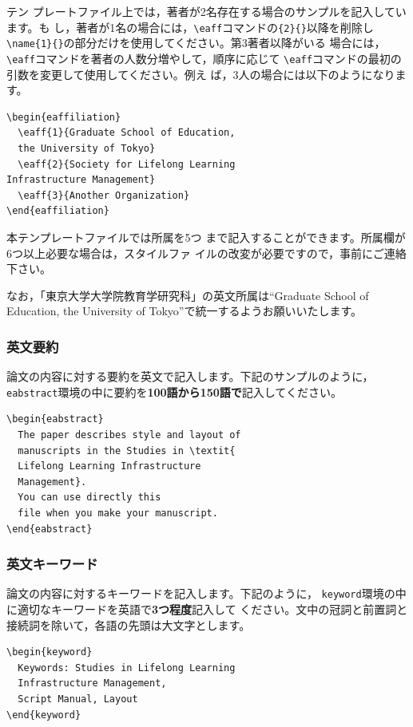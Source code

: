 \documentclass[b5paper,10pt,twocolumn,tombow]{jarticle}
\begin{document}
テン
プレートファイル上では，著者が2名存在する場合のサンプルを記入しています。も
し，著者が1名の場合には，\verb|\eaff|コマンドの\verb|{2}{}|以降を削除し
\verb|\name{1}{}|の部分だけを使用してください。第3著者以降がいる
場合には，\verb|\eaff|コマンドを著者の人数分増やして，順序に応じて
\verb|\eaff|コマンドの最初の引数を変更して使用してください。例え
ば，3人の場合には以下のようになります。

\begin{verbatim}
\begin{eaffiliation}
  \eaff{1}{Graduate School of Education,
  the University of Tokyo}
  \eaff{2}{Society for Lifelong Learning
Infrastructure Management}
  \eaff{3}{Another Organization}
\end{eaffiliation}
\end{verbatim}
本テンプレートファイルでは所属を5つ
まで記入することができます。所属欄が6つ以上必要な場合は，スタイルファ
イルの改変が必要ですので，事前にご連絡下さい。

なお，「東京大学大学院教育学研究科」の英文所属は``Graduate School of
Education, the University of
Tokyo''で統一するようお願いいたします。

\subsubsection{英文要約}
論文の内容に対する要約を英文で記入します。下記のサンプルのように，
\texttt{eabstract}環境の中に要約を\textbf{100語から150語で}記入してください。


\begin{verbatim}
\begin{eabstract}
  The paper describes style and layout of
  manuscripts in the Studies in \textit{
  Lifelong Learning Infrastructure
  Management}.
  You can use directly this
  file when you make your manuscript.
\end{eabstract}
\end{verbatim}


\subsubsection{英文キーワード}
論文の内容に対するキーワードを記入します。下記のように，
\texttt{keyword}環境の中に適切なキーワードを英語で\textbf{3つ程度}記入して
ください。文中の冠詞と前置詞と接続詞を除いて，各語の先頭は大文字とします。

\begin{verbatim}
\begin{keyword}
  Keywords: Studies in Lifelong Learning
  Infrastructure Management,
  Script Manual, Layout
\end{keyword}
\end{verbatim}
\end{document}
